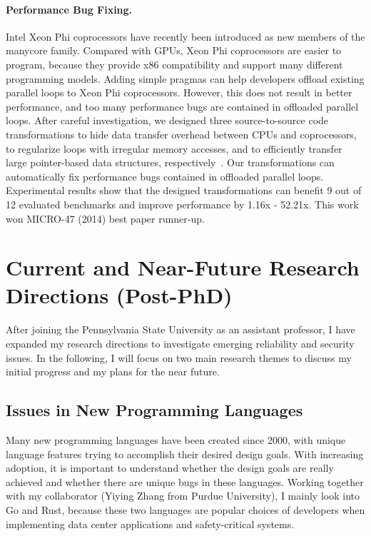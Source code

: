 \documentclass[10pt]{article}
\begin{document}
\paragraph{Performance Bug Fixing.}
Intel Xeon Phi coprocessors have recently been introduced 
as new members of the manycore family.
Compared with GPUs, Xeon Phi coprocessors are easier to program,
because they provide x86 compatibility and support many different programming models.
Adding simple pragmas can help developers offload existing parallel loops 
to Xeon Phi coprocessors. 
However, this does not result in better performance, 
and too many performance bugs are contained in 
offloaded parallel loops. 
After careful investigation, we designed three source-to-source code transformations to 
hide data transfer overhead between CPUs and coprocessors, 
to regularize loops with irregular memory accesses, 
and to efficiently transfer large pointer-based data structures, respectively~\cite{Song14MICRO}.
Our transformations can automatically fix performance bugs contained in offloaded parallel loops. 
Experimental results show that the designed transformations can benefit 9 
out of 12 evaluated benchmarks and improve performance by 1.16x - 52.21x. 
This work won MICRO-47 (2014) best paper runner-up.


\vspace{-.1in}
\section{Current and Near-Future Research Directions (Post-PhD)}
After joining the Pennsylvania State University as an assistant professor,
I have expanded my research directions to investigate
emerging reliability and security issues.  
In the following, I will focus on two main research themes 
to discuss my initial progress and my plans for the near future. 

\vspace{-.1in}
\subsection{Issues in New Programming Languages}
Many new programming languages have been created since 2000, 
with unique language features trying to accomplish their desired design goals.
With increasing adoption, it is important to understand 
whether the design goals are really achieved 
and whether there are unique bugs in these languages. 
Working together with my collaborator (Yiying Zhang from Purdue University), 
I mainly look into Go and Rust, because 
these two languages are popular choices 
of developers when implementing 
data center applications and safety-critical systems. 
 
\end{document}
